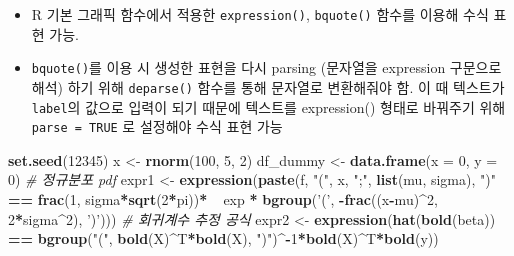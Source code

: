 \documentclass[
  11pt,
]{krantz}
\newenvironment{Shaded}{\begin{snugshade}}{\end{snugshade}}
\newcommand{\CommentTok}[1]{\textcolor[rgb]{0.37,0.37,0.37}{\textit{#1}}}
\newcommand{\DataTypeTok}[1]{\textcolor[rgb]{0.27,0.27,0.27}{#1}}
\newcommand{\DecValTok}[1]{\textcolor[rgb]{0.06,0.06,0.06}{#1}}
\newcommand{\ErrorTok}[1]{\textcolor[rgb]{0.14,0.14,0.14}{\textbf{#1}}}
\newcommand{\KeywordTok}[1]{\textcolor[rgb]{0.27,0.27,0.27}{\textbf{#1}}}
\newcommand{\NormalTok}[1]{#1}
\newcommand{\OperatorTok}[1]{\textcolor[rgb]{0.43,0.43,0.43}{\textbf{#1}}}
\newcommand{\StringTok}[1]{\textcolor[rgb]{0.5,0.5,0.5}{#1}}
\providecommand{\tightlist}{%
  \setlength{\itemsep}{0pt}\setlength{\parskip}{0pt}}
\begin{document}
\begin{itemize}
\tightlist
\item
  R 기본 그래픽 함수에서 적용한 \texttt{expression()}, \texttt{bquote()} 함수를 이용해 수식 표현 가능.
\item
  \texttt{bquote()}를 이용 시 생성한 표현을 다시 parsing (문자열을 expression 구문으로 해석) 하기 위해 \texttt{deparse()} 함수를 통해 문자열로 변환해줘야 함. 이 때 텍스트가 \texttt{label}의 값으로 입력이 되기 때문에 텍스트를 expression() 형태로 바꿔주기 위해 \texttt{parse\ =\ TRUE} 로 설정해야 수식 표현 가능
\end{itemize}

\footnotesize

\begin{Shaded}
\begin{Highlighting}[]
\KeywordTok{set.seed}\NormalTok{(}\DecValTok{12345}\NormalTok{)}
\NormalTok{x <-}\StringTok{ }\KeywordTok{rnorm}\NormalTok{(}\DecValTok{100}\NormalTok{, }\DecValTok{5}\NormalTok{, }\DecValTok{2}\NormalTok{)}
\NormalTok{df_dummy <-}\StringTok{ }\KeywordTok{data.frame}\NormalTok{(}\DataTypeTok{x =} \DecValTok{0}\NormalTok{, }\DataTypeTok{y =} \DecValTok{0}\NormalTok{)}
\CommentTok{# 정규분포 pdf }
\NormalTok{expr1 <-}\StringTok{ }\KeywordTok{expression}\NormalTok{(}\KeywordTok{paste}\NormalTok{(f, }
                          \StringTok{"("}\NormalTok{, x, }\StringTok{";"}\NormalTok{, }\KeywordTok{list}\NormalTok{(mu, sigma), }\StringTok{")"}
                          \OperatorTok{==}\StringTok{ }\KeywordTok{frac}\NormalTok{(}\DecValTok{1}\NormalTok{, sigma}\OperatorTok{*}\KeywordTok{sqrt}\NormalTok{(}\DecValTok{2}\OperatorTok{*}\NormalTok{pi))}\OperatorTok{*}\ErrorTok{~~}\NormalTok{exp }\OperatorTok{*}
\StringTok{                            }\KeywordTok{bgroup}\NormalTok{(}\StringTok{'('}\NormalTok{, }
                                   \OperatorTok{-}\KeywordTok{frac}\NormalTok{((x}\OperatorTok{-}\NormalTok{mu)}\OperatorTok{^}\DecValTok{2}\NormalTok{, }
                                         \DecValTok{2}\OperatorTok{*}\NormalTok{sigma}\OperatorTok{^}\DecValTok{2}\NormalTok{), }\StringTok{')'}\NormalTok{)))}
\CommentTok{# 회귀계수 추정 공식}
\NormalTok{expr2 <-}\StringTok{ }\KeywordTok{expression}\NormalTok{(}\KeywordTok{hat}\NormalTok{(}\KeywordTok{bold}\NormalTok{(beta)) }\OperatorTok{==}
\StringTok{                    }\KeywordTok{bgroup}\NormalTok{(}\StringTok{"("}\NormalTok{, }\KeywordTok{bold}\NormalTok{(X)}\OperatorTok{^}\NormalTok{T}\OperatorTok{*}\KeywordTok{bold}\NormalTok{(X), }
                     \StringTok{")"}\NormalTok{)}\OperatorTok{^-}\DecValTok{1}\OperatorTok{*}\KeywordTok{bold}\NormalTok{(X)}\OperatorTok{^}\NormalTok{T}\OperatorTok{*}\KeywordTok{bold}\NormalTok{(y))}

\end{Highlighting}
\end{Shaded}
\end{document}
